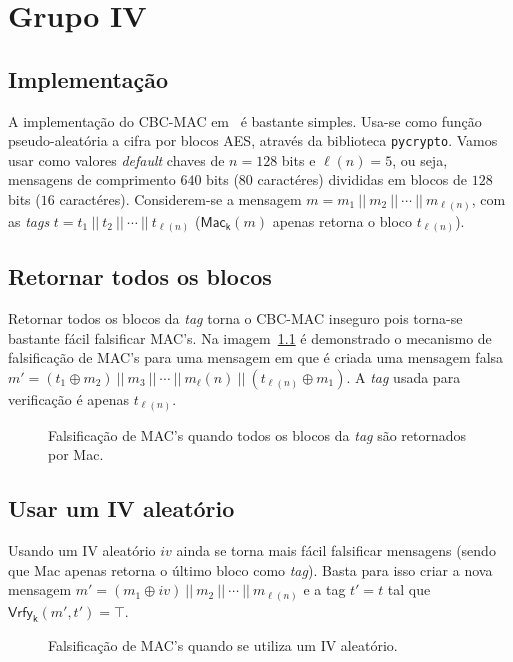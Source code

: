 \chapter{Grupo IV}
\section{Implementação}
A implementação do CBC-MAC em \sage\ é bastante simples. Usa-se como função pseudo-aleatória a cifra por blocos AES, através da biblioteca \verb|pycrypto|. Vamos usar como valores \textit{default} chaves de $n = 128$ bits e $\ell(n) = 5$, ou seja, mensagens de comprimento $640$ bits ($80$ caractéres) divididas em blocos de $128$ bits ($16$ caractéres). Considerem-se a mensagem $m = m_1\ ||\ m_2\ ||\ \cdots\ ||\ m_{\ell(n)}$, com as \textit{tags} $t = t_1\ ||\ t_2\ ||\ \cdots\ ||\ t_{\ell(n)}$ ($\mathsf{Mac_k}(m)$ apenas retorna o bloco $t_{\ell(n)}$).
\section{Retornar todos os blocos}
Retornar todos os blocos da \textit{tag} torna o CBC-MAC inseguro pois torna-se bastante fácil falsificar MAC's. Na imagem~\ref{img:cbcmac} é demonstrado o mecanismo de falsificação de MAC's para uma mensagem em que é criada uma mensagem falsa $m' =  (t_1 \oplus m_2)\ ||\ m_3\ ||\ \cdots\ ||\ m_\ell(n)\ ||\ (t_{\ell(n)} \oplus m_1)$. A \textit{tag} usada para verificação é apenas $t_{\ell(n)}$.
\begin{figure}[h!]
\centering
  
  \caption{Falsificação de MAC's quando todos os blocos da \textit{tag} são retornados por \textsf{Mac}.}
  \label{img:cbcmac}
\end{figure}
%
\section{Usar um \textsf{IV} aleatório}
Usando um \textsf{IV} aleatório $iv$ ainda se torna mais fácil falsificar mensagens (sendo que \textsf{Mac} apenas retorna o último bloco como \textit{tag}). Basta para isso criar a nova mensagem $m' = (m_1 \oplus iv)\ ||\ m_2\ ||\ \cdots\ ||\ m_{\ell(n)}$ e a tag $t' = t$ tal que $\mathsf{Vrfy_k}(m', t') = \top$.
\begin{figure}[h!]
\centering
  
  \caption{Falsificação de MAC's quando se utiliza um \textsf{IV} aleatório.}
  \label{img:randiv}
\end{figure}
